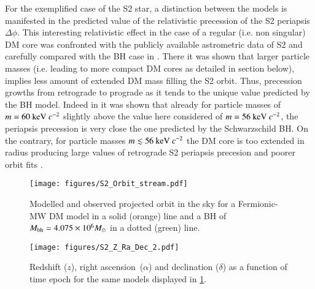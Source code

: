 \documentclass[twocolumn]{aa}
\begin{document}
For the exemplified case of the S2 star, a distinction between the models is manifested in the predicted value of the relativistic precession of the S2 periapsis $\Delta \phi$. This interesting relativistic effect in the case of a regular (i.e. non singular) DM core was confronted with the publicly available astrometric data of S2 and carefully compared with the BH case in \cite{2022MNRAS.511L..35A}. There it was shown that larger particle masses (i.e. leading to more compact DM cores as detailed in section below), implies less amount of extended DM mass filling the S2 orbit. Thus, precession growths from retrograde to prograde as it tends to the unique value predicted by the BH model. Indeed in \cite{2022MNRAS.511L..35A} it was shown that already for particle masses of $m = 60~{\rm keV}~c^{-2}$ slightly above the value here considered of $m=56~{\rm keV}~c^{-2}$, the periapsis precession is very close the one predicted by the Schwarzschild BH. On the contrary, for particle masses $m\lesssim 56~{\rm keV}~c^{-2}$ the DM core is too extended in radius producing large values of retrograde S2 periapsis precesion and poorer orbit fits \cite{2020A&A...641A..34B,2022MNRAS.511L..35A}. %
%
%
\begin{figure}
   \texttt{[image: figures/S2\_Orbit\_stream.pdf]}
\caption{Modelled and observed projected orbit in the sky for a Fermionic-MW DM model in a solid (orange) line and a BH of $M_{\rm bh}=4.075\times 10^6 M_\odot$ in a dotted (green) line.}
   \label{fig:S2_fit}
\end{figure}

\begin{figure}
   \texttt{[image: figures/S2\_Z\_Ra\_Dec\_2.pdf]}
   \caption{Redshift ($z$), right ascension~($\alpha$) and declination ($\delta$) as a function of time epoch for the same models
   displayed in \cref{fig:S2_fit}.}
   \label{fig:S2_fit_b}
\end{figure}
\end{document}
